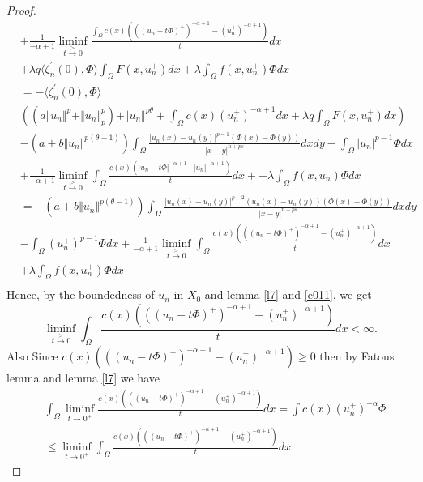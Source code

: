 \documentclass[10pt,twoside,reqno,centertags,draft]{amsart}
\begin{document}
\begin{proof}
\begin{equation*}
\begin{aligned}
& +\frac{1}{-\alpha +1}\liminf_{t \xrightarrow{>} 0}
\frac{\int_{\Omega} c(x) \left(((u_n -t\Phi)^+)^{-\alpha +1} -(u_n^+)^{-\alpha +1}\right)}{t}dx\\
& +\lambda q\langle\zeta^{\prime}_n(0), \Phi\rangle\int_{\Omega} F(x,u_n^+)dx +\lambda \int_{\Omega}f(x, u_n^+)\Phi dx\\
& = -\langle\zeta^{\prime}_n(0), \Phi\rangle\\
&\left( \left(a\Vert u_n\Vert^{p} +\Vert u_n\Vert^{p}_{p}\right) +\Vert u_n\Vert^{p\theta} +\int_{\Omega}c(x) ( u_n^+)^{-\alpha +1}dx +\lambda q \int_{\Omega} F(x,u_n^+)dx\right)\\
& -\left( a +b\Vert u_n\Vert^{p(\theta -1)}\right)\int_{\Omega}\frac{\vert u_n(x) -u_n(y)\vert^{p -1}(\Phi(x) -\Phi(y))}{\vert x -y\vert^{n +ps}}dxdy -\int_{\Omega}\vert u_n\vert^{p-1}\Phi dx\\
&+\frac{1}{-\alpha +1}\liminf_{t \xrightarrow{>} 0}\int_{\Omega} \frac{c(x) \left(\vert u_n -t\Phi\vert^{-\alpha +1} -\vert u_n\vert^{-\alpha +1}\right)}{t}dx ++\lambda \int_{\Omega}f(x, u_n)\Phi dx\\
& =-\left( a +b\Vert u_n\Vert^{p(\theta -1)}\right)\int_{\Omega}\frac{\vert u_n(x) -u_n(y)\vert^{p -2}(u_n(x) -u_n(y))(\Phi(x) -\Phi(y))}{\vert x -y\vert^{n +ps}}dxdy \\
&-\int_{\Omega}(u_n^+)^{p-1}\Phi dx +\frac{1}{-\alpha +1}\liminf_{t \xrightarrow{>} 0}\int_{\Omega} \frac{c(x) \left(((u_n -t\Phi)^+)^{-\alpha +1} -( u_n^+)^{-\alpha +1}\right)}{t}dx\\
& +\lambda \int_{\Omega}f(x, u_n^+)\Phi dx\\
\end{aligned}
\end{equation*}
Hence, by the boundedness of $ u_n$ in $ X_0$ and lemma \ref{l7} and \ref{e011}, we get 
\begin{equation*}
\liminf_{t \xrightarrow{>} 0}\int_{\Omega} \frac{c(x) \left(((u_n -t\Phi)^+)^{-\alpha +1} -(u_n^+)^{-\alpha +1}\right)}{t}dx <\infty.
\end{equation*}
Also Since $ c(x) \left(((u_n -t\Phi)^+)^{-\alpha +1} -(u_n^+)^{-\alpha +1}\right) \geq 0$ then by Fatous lemma and lemma \ref{l7} we have 
\begin{equation*}
\begin{aligned}
&\int_{\Omega} \liminf_{t \to 0^+}\frac{c(x) \left(((u_n -t\Phi)^+)^{-\alpha +1} -(u_n^+)^{-\alpha +1}\right)}{t}dx = \int c(x)(u_n^+)^{-\alpha}\Phi \\
&\leq \liminf_{t \to 0^+}\int_{\Omega} \frac{c(x) \left(((u_n -t\Phi)^+)^{-\alpha +1} -(u_n^+)^{-\alpha +1}\right)}{t}dx 

\end{aligned}
\end{equation*}
\end{proof}
\end{document}
